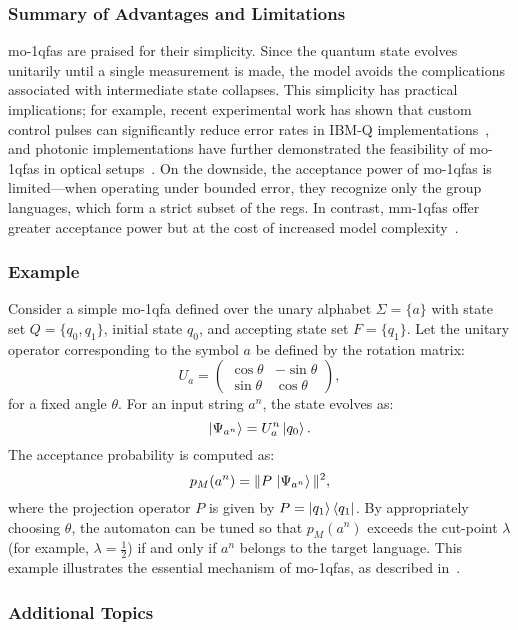 \subsubsection{Summary of Advantages and Limitations}
\glspl{mo-1qfa} are praised for their simplicity. Since the quantum state evolves unitarily until a single measurement is made, the model avoids the complications associated with intermediate state collapses. This simplicity has practical implications; for example, recent experimental work has shown that custom control pulses can significantly reduce error rates in IBM-Q implementations~\cite{lussi2024implementing}, and photonic implementations have further demonstrated the feasibility of \glspl{mo-1qfa} in optical setups~\cite{candeloro2021enhanced}. On the downside, the acceptance power of \glspl{mo-1qfa} is limited—when operating under bounded error, they recognize only the group languages, which form a strict subset of the \glspl{reg}. In contrast, \glspl{mm-1qfa} offer greater acceptance power but at the cost of increased model complexity~\cite{kondacs1997power,berzicna2001ambainis}.

\subsubsection{Example}
Consider a simple \gls{mo-1qfa} defined over the unary alphabet $\Sigma=\{a\}$ with state set $Q=\{q_0,q_1\}$, initial state $q_0$, and accepting state set $F=\{q_1\}$. Let the unitary operator corresponding to the symbol $a$ be defined by the rotation matrix:
\[
U_a = \begin{pmatrix}
\cos\theta & -\sin\theta \\
\sin\theta & \cos\theta
\end{pmatrix},
\]
for a fixed angle $\theta$. For an input string $a^n$, the state evolves as:
\[
\ket{\Psi_{a^n}} = U_a^n \ket{q_0}.
\]
The acceptance probability is computed as:
\[
p_M(a^n)=\|P\,\ket{\Psi_{a^n}}\|^2,
\]
where the projection operator $P$ is given by $P=\ket{q_1}\bra{q_1}$. By appropriately choosing $\theta$, the automaton can be tuned so that $p_M(a^n)$ exceeds the cut-point $\lambda$ (for example, $\lambda=\frac{1}{2}$) if and only if $a^n$ belongs to the target language. This example illustrates the essential mechanism of \glspl{mo-1qfa}, as described in~\cite{moore2000quantum,brodsky2002characterizations}.

\subsubsection{Additional Topics}
